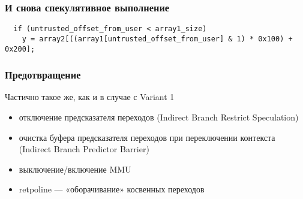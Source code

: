 \subsubsection{И снова спекулятивное выполнение}
\begin{frame}[fragile]{\insertsubsubsection}

  \begin{verbatim}
  if (untrusted_offset_from_user < array1_size)
    y = array2[((array1[untrusted_offset_from_user] & 1) * 0x100) + 0x200];
  \end{verbatim}

\end{frame}

\subsubsection{Предотвращение}
\begin{frame}{\insertsubsubsection}

  \LARGE

  Частично такое же, как и в случае с Variant 1

  \begin{itemize}
  \item отключение предсказателя переходов (Indirect Branch Restrict
    Speculation)
  \item очистка буфера предсказателя переходов при переключении контекста
    (Indirect Branch Predictor Barrier)
  \item выключение/включение MMU
  \item retpoline --- «оборачивание» косвенных переходов
  \end{itemize}


\end{frame}